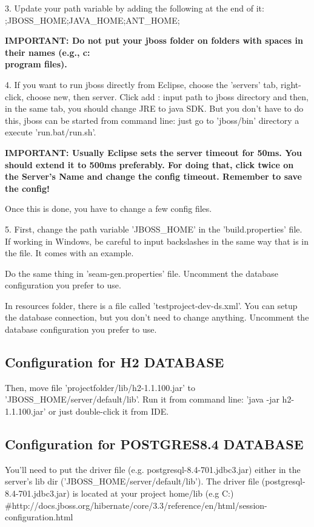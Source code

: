 3. Update your path variable by adding the following at the end of it:	
;JBOSS_HOME\bin;JAVA_HOME\bin;ANT_HOME\bin;

\textbf{IMPORTANT: Do not put your jboss folder on folders with spaces in their names (e.g., c:\\program files).}

4. If you want to run jboss directly from Eclipse, choose the 'servers' tab, right-click, choose new, then server. Click add : input path to jboss directory and then, in the same tab, you should change JRE to java SDK. But you don't have to do this, jboss can be started from command line: just go to 'jboss/bin' directory a execute 'run.bat/run.sh'.

\textbf{IMPORTANT: Usually Eclipse sets the server timeout for 50ms. You should extend it to 500ms preferably. For doing that, click twice on the Server's Name and change the config timeout. Remember to save the config!}

Once this is done, you have to change a few config files.

5. First, change the path variable 'JBOSS_HOME' in the 'build.properties' file. If working in Windows, be careful to input backslashes in the same way that is in the file. It comes with an example.

Do the same thing in 'seam-gen.properties' file. Uncomment the database configuration you prefer to use.

In resources folder, there is a file called 'testproject-dev-ds.xml'. You can setup the database connection, but you don't need to change anything. Uncomment the database configuration you prefer to use.

\subsection{Configuration for H2 DATABASE}
Then, move file 'projectfolder/lib/h2-1.1.100.jar' to 'JBOSS_HOME/server/default/lib'. Run it from command line: 'java -jar h2-1.1.100.jar' or just double-click it from IDE.

\subsection{Configuration for POSTGRES8.4 DATABASE}
You'll need to put the driver file (e.g. postgresql-8.4-701.jdbc3.jar) either in the server's lib dir ('JBOSS_HOME/server/default/lib').
The driver file (postgresql-8.4-701.jdbc3.jar) is located at your project home/lib (e.g C:\Users\xu\workspace\testproject\lib)
#http://docs.jboss.org/hibernate/core/3.3/reference/en/html/session-configuration.html

